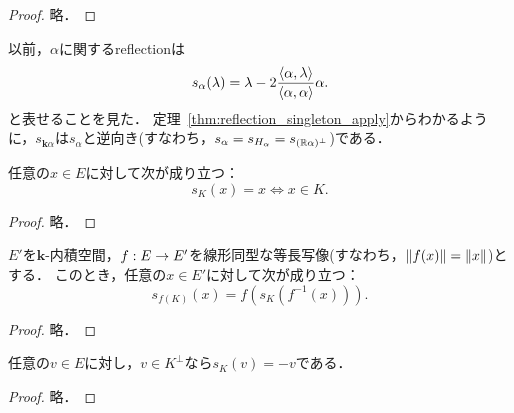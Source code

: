 \begin{proof}
  \leanok
  略．
\end{proof}

\begin{rem}
  以前，$\alpha$に関するreflectionは
  \begin{equation}
    s_\alpha (\lambda) = \lambda - 2\frac{\left\langle \alpha, \lambda \right\rangle}{\left\langle \alpha, \alpha \right\rangle} \alpha.
  \end{equation}
  と表せることを見た．
  定理~\ref{thm:reflection_singleton_apply}からわかるように，$s_{\bm{k}\alpha}$は$s_\alpha$と逆向き(すなわち，$s_\alpha = s_{H_\alpha} = s_{(\mathbb{R} \alpha)^\perp}$)である．
\end{rem}

\begin{thm}
  \label{thm:reflection_eq_self_iff}
  \leanok
  任意の$x \in E$に対して次が成り立つ：
  \begin{equation}
    s_K(x) = x \iff x \in K.
  \end{equation}
\end{thm}

\begin{proof}
  \leanok
  略．
\end{proof}

\begin{thm}
  \label{thm:reflection_map_apply}
  \leanok
  $E'$を$\bm{k}$-内積空間，$f : E \rightarrow E'$を線形同型な等長写像(すなわち，$\left\| f(x) \right\| = \left\| x \right\|$)とする．
  このとき，任意の$x \in E'$に対して次が成り立つ：
  \begin{equation}
    s_{f(K)}(x) = f(s_K(f^{-1}(x))).
  \end{equation}
\end{thm}

\begin{proof}
  \leanok
  略．
\end{proof}

\begin{thm}
  \label{thm:reflection_mem_subspace_orthogonalComplement_eq_neg}
  \leanok
  任意の$v \in E$に対し，$v \in K^\perp$なら$s_K(v) = -v$である．
\end{thm}

\begin{proof}
  \leanok
  略．
\end{proof}

